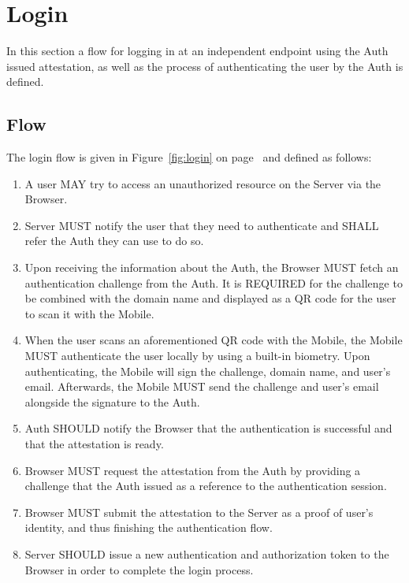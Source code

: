 \section{Login}
In this section a flow for logging in at an independent endpoint using the Auth issued attestation, as well as the 
process of authenticating the user by the Auth is defined. 

    \subsection{Flow}
    The login flow is given in Figure~\ref{fig:login} on page~\pageref{fig:login} and defined as follows:
        \begin{enumerate}
            \item A user MAY try to access an unauthorized resource on the Server via the Browser.
            \item Server MUST notify the user that they need to authenticate and SHALL refer the Auth they can use 
                  to do so.
            \item Upon receiving the information about the Auth, the Browser MUST fetch an authentication challenge
                  from the Auth. It is REQUIRED for the challenge to be combined with the domain name and
                  displayed as a QR code for the user to scan it with the Mobile.
            \item When the user scans an aforementioned QR code with the Mobile, the Mobile MUST authenticate the 
                  user locally by using a built-in biometry. Upon authenticating, the Mobile will sign the 
                  challenge, domain name, and user's email. Afterwards, the Mobile MUST send the challenge and user's
                  email alongside the signature to the Auth.
            \item Auth SHOULD notify the Browser that the authentication is successful and that the attestation is
                  ready.
            \item Browser MUST request the attestation from the Auth by providing a challenge that the Auth issued 
                  as a reference to the authentication session.
            \item Browser MUST submit the attestation to the Server as a proof of user's identity, and thus finishing 
                  the authentication flow.
            \item Server SHOULD issue a new authentication and authorization token to the Browser in order to complete
                  the login process.
        \end{enumerate}
        

